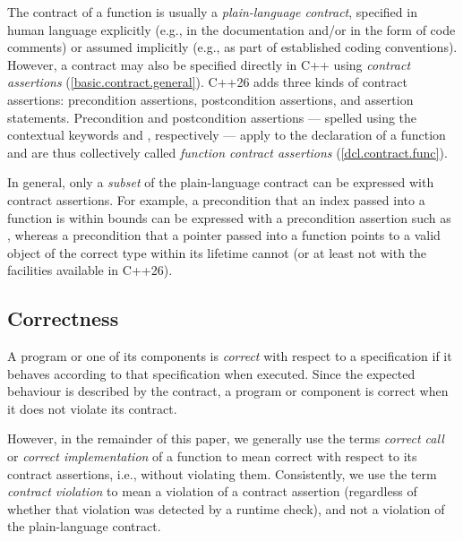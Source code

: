 The contract of a function is usually a \emph{plain-language contract}, specified in human language explicitly (e.g., in the documentation and/or in the form of code comments) or assumed implicitly (e.g., as part of established coding conventions). However, a contract may also be specified directly in C++ using  \emph{contract assertions} (\href{https://eel.is/c++draft/basic.contract.general}{[basic.contract.general]}).
C++26 adds three kinds of contract assertions: precondition assertions, postcondition assertions, and assertion statements. Precondition and postcondition assertions --- spelled using the contextual keywords  and , respectively --- apply to the declaration of a function and are thus collectively called \emph{function contract assertions} (\href{https://eel.is/c++draft/dcl.contract.func}{[dcl.contract.func]}).

In general, only a \emph{subset} of the plain-language contract can be expressed with contract assertions. For example, a precondition that an index passed into a function is within bounds can be expressed with a precondition assertion such as \mbox{}, whereas a precondition that a pointer passed into a function points to a valid object of the correct type within its lifetime cannot (or at least not with the facilities available in C++26).

\subsection{Correctness}
\label{correctness}

A program or one of its components is \emph{correct} with respect to a specification if it behaves according to that specification when executed. Since the expected behaviour is described by the contract, a program or component is correct when it does not violate its contract. %

However, in the remainder of this paper, we generally use the terms \emph{correct call} or \emph{correct implementation} of a function to mean {correct with respect to its contract assertions}, i.e., without violating them. Consistently, we use the term \emph{contract violation} to mean a violation of a contract assertion (regardless of whether that violation was detected by a runtime check), and not a violation of the plain-language contract.
 
